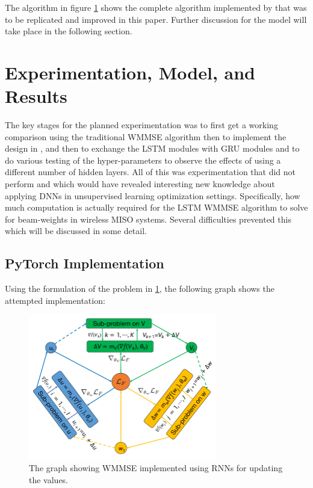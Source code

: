 \documentclass[journal]{IEEEtran}
\begin{document}
The algorithm in figure \ref{fig:LSTM_Algo} shows the complete algorithm implemented by \cite{LSTM_Net} that was to be replicated and improved in this paper. Further discussion for the model will take place in the following section.

\section{Experimentation, Model, and Results}
The key stages for the planned experimentation was to first get a working comparison using the traditional WMMSE algorithm then to implement the design in \cite{LSTM_Net}, and then to exchange the LSTM modules with GRU modules and to do various testing of the hyper-parameters to observe the effects of using a different number of hidden layers. All of this was experimentation that \cite{LSTM_Net} did not perform and which would have revealed interesting new knowledge about applying DNNs in unsupervised learning optimization settings. Specifically, how much computation is actually required for the LSTM WMMSE algorithm to solve for beam-weights in wireless MISO systems. Several difficulties prevented this which will be discussed in some detail.

\subsection{PyTorch Implementation} 
Using the formulation of the problem in \ref{fig:LSTM_Algo}, the following graph shows the attempted implementation:

\begin{figure}[h]%
\includegraphics[width=3.25in]{assets/image-20231115093829461.png}%
\caption{The graph showing WMMSE implemented using RNNs for updating the values.}%
\label{fig:LSTM_Algo}%
\end{figure}
\end{document}
